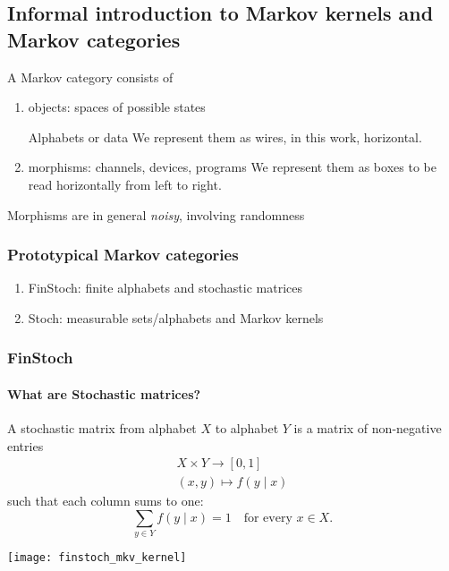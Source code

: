 \subsection{Informal introduction to Markov kernels and Markov categories}

\begin{frame}
    A Markov category consists of
    \begin{enumerate}
        \item objects: spaces of possible states\par
            Alphabets or data
            We represent them as wires, in this work, horizontal.
        \item morphisms: channels, devices, programs
            We represent them as boxes to be read horizontally from left to right.
    \end{enumerate}
    Morphisms are in general \emph{noisy}, involving randomness
\end{frame}

\begin{frame}
    \frametitle{Prototypical Markov categories}
    \begin{enumerate}
        \item FinStoch: finite alphabets and stochastic matrices
        \item Stoch: measurable sets/alphabets and Markov kernels
    \end{enumerate}
\end{frame}

\begin{frame}
    \frametitle{FinStoch}
    \framesubtitle{What are Stochastic matrices?}
    \begin{minipage}{.48\textwidth}
        A stochastic matrix from alphabet $X$ to alphabet $Y$ is a matrix of non-negative entries
        \begin{align*}
            X\times Y \to [0,1]\\
            (x, y) \mapsto f(y\mid x)
        \end{align*}
        such that each column sums to one:
        \[
            \sum_{y\in Y} f(y\mid x) = 1 \quad \text{for every $x\in X$.}
        \]
    \end{minipage}
    \hfill
    \begin{minipage}{.48\textwidth}
        \texttt{[image: finstoch\_mkv\_kernel]}
    \end{minipage}
\end{frame}

